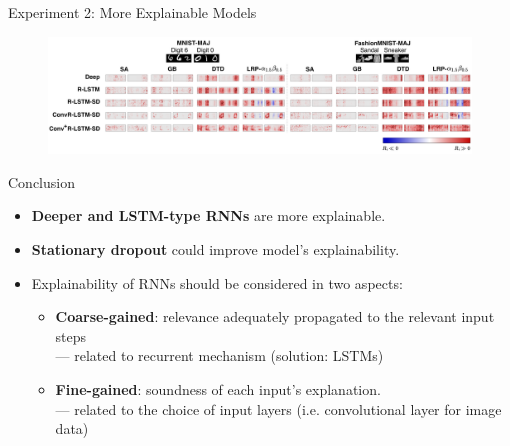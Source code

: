 \documentclass[Nike]{tuberlinbeamer}
\begin{document}
\begin{frame}{Experiment 2: More Explainable Models}
{		 \begin{figure}[h]
			\includegraphics [width=\textwidth]{figures/present_exp2_result_heatmap_3}
		\end{figure}
		
		\vfill
		
		}




\end{frame}


\begin{frame}{Conclusion}

\begin{itemize}
	\item \textbf{Deeper and LSTM-type RNNs} are more explainable.
	\item \textbf{Stationary dropout} could improve model's explainability.
	\item Explainability of RNNs should be considered in two aspects:
		\begin{itemize}
			\item \textbf{Coarse-gained}: relevance adequately propagated to the relevant input steps \\
					--- related to recurrent mechanism (solution: LSTMs)
			\item \textbf{Fine-gained}: soundness of each input's explanation.\\
					--- related to the choice of input layers (i.e. convolutional layer for image data)
		\end{itemize}
\end{itemize}
\end{frame}
\end{document}
